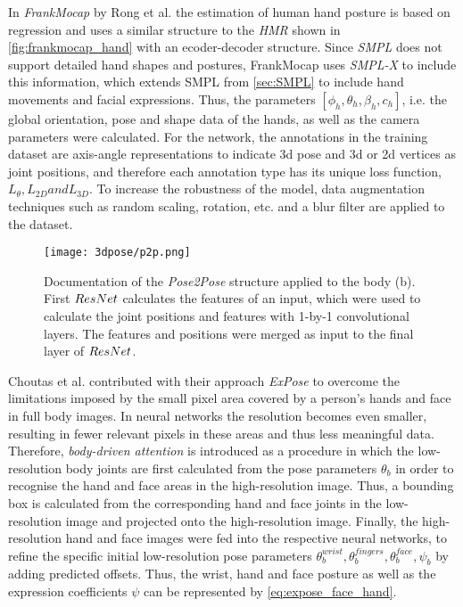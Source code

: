 In \emph{FrankMocap} by Rong et al. \cite{frankmocap} the estimation of human hand posture is based on regression and uses a similar structure to the \emph{HMR} shown in \autoref{fig:frankmocap_hand} with an ecoder-decoder structure. Since \emph{SMPL} does not support detailed hand shapes and postures, FrankMocap uses \emph{SMPL-X} to include this information, which extends SMPL from \autoref{sec:SMPL} to include hand movements and facial expressions. Thus, the parameters $[\phi_{h},\theta_{h},\beta_{h},c_{h}]$, i.e. the global orientation, pose and shape data of the hands, as well as the camera parameters were calculated. For the network, the annotations in the training dataset are axis-angle representations to indicate 3d pose and 3d or 2d vertices as joint positions, and therefore each annotation type has its unique loss function,  $L_{\theta}, L_{2D} and L_{3D}$. To increase the robustness of the model, data augmentation techniques such as random scaling, rotation, etc. and a blur filter are applied to the dataset.

\begin{figure}[!h]
	\centering
	\texttt{[image: 3dpose/p2p.png]}
	\caption{Documentation of the \emph{Pose2Pose} structure applied to the body (b). First $\protect ResNet$ calculates the features of an input, which were used to calculate the joint positions and features with 1-by-1 convolutional layers. The features and positions were merged as input to the final layer of $\protect ResNet$.\cite{moon}}
	\label{fig:p2p}
\end{figure}

Choutas et al. \cite{expose} contributed with their approach \emph{ExPose} to overcome the limitations imposed by the small pixel area covered by a person's hands and face in full body images. In neural networks the resolution becomes even smaller, resulting in fewer relevant pixels in these areas and thus less meaningful data.
Therefore, \emph{body-driven attention} is introduced as a procedure in which the low-resolution body joints are first calculated from the pose parameters $\theta_{b}$ in order to recognise the hand and face areas in the high-resolution image. Thus, a bounding box is calculated from the corresponding hand and face joints in the low-resolution image and projected onto the high-resolution image. Finally, the high-resolution hand and face images were fed into the respective neural networks, to  refine the specific initial low-resolution pose parameters $\theta_{b}^{wrist}, \theta_{b}^{fingers}, \theta_{b}^{face}, \psi_{b}$ by adding predicted offsets. Thus, the wrist, hand and face posture as well as the expression coefficients $\psi$ can be represented by \autoref{eq:expose_face_hand}.

